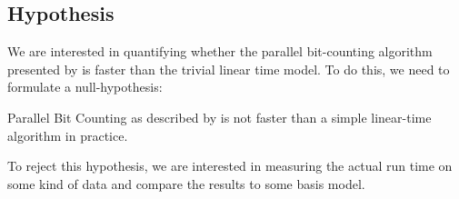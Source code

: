 \subsection{Hypothesis}
We are interested in quantifying whether the parallel bit-counting algorithm presented by \citet{fast-similarity-search} is faster than the trivial linear time model. To do this, we need to formulate a null-hypothesis:
\begin{hypothesis}
    Parallel Bit Counting as described by \citet{fast-similarity-search} is not faster than a simple linear-time algorithm in practice.
\end{hypothesis}
To reject this hypothesis, we are interested in measuring the actual run time on some kind of data and compare the results to some basis model. %
